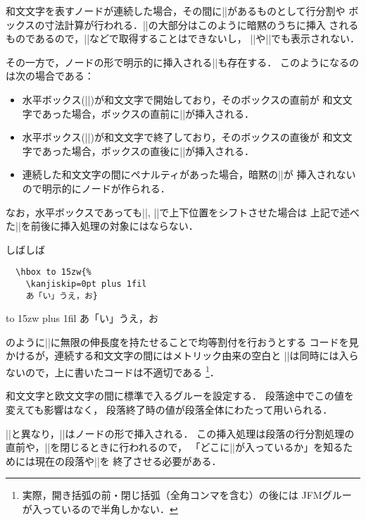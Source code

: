 \documentclass[a4paper,11pt,nomag,dvipdfmx]{jsarticle}
\begin{document}
\begin{dangerous}
 和文文字を表すノードが連続した場合，その間に|\kanjiskip|があるものとして行分割や
 ボックスの寸法計算が行われる．|\kanjiskip|の大部分はこのように暗黙のうちに挿入
 されるものであるので，|\lastskip|などで取得することはできないし，
 |\showlists|や|\showbox|でも表示されない．

  その一方で，ノードの形で明示的に挿入される|\kanjiskip|も存在する．
  このようになるのは次の場合である：
 \begin{itemize}
  \item 水平ボックス(|\hbox|)が和文文字で開始しており，そのボックスの直前が
    和文文字であった場合，ボックスの直前に|\kanjiskip|が挿入される．
  \item 水平ボックス(|\hbox|)が和文文字で終了しており，そのボックスの直後が
    和文文字であった場合，ボックスの直後に|\kanjiskip|が挿入される．
  \item 連続した和文文字の間にペナルティがあった場合，暗黙の|\kanjiskip|が
    挿入されないので明示的にノードが作られる．
 \end{itemize}
 なお，水平ボックスであっても|\raise|, |\lower|で上下位置をシフトさせた場合は
 上記で述べた|\kanjiskip|を前後に挿入処理の対象にはならない．
\end{dangerous}
\begin{dangerous}
  しばしば

  \medskip
  \begin{minipage}{.6\linewidth}
  \begin{verbatim}
  \hbox to 15zw{%
    \kanjiskip=0pt plus 1fil
    あ「い」うえ，お}
  \end{verbatim}
  \end{minipage}\hfill
  \begin{minipage}{.3\linewidth}
  \hbox to 15zw{%
    \kanjiskip=0pt plus 1fil
    あ「い」うえ，お}
  \end{minipage}

  \noindent
  のように|\kanjiskip|に無限の伸長度を持たせることで均等割付を行おうとする
  コードを見かけるが，連続する和文文字の間にはメトリック由来の空白と
  |\kanjiskip|は同時には入らないので，上に書いたコードは不適切である
 \footnote{実際，開き括弧の前・閉じ括弧（全角コンマを含む）の後には
 JFMグルーが入っているので半角しかない．
 }．
\end{dangerous}

\begin{cslist}
\csitem[\.{xkanjiskip}=<skip>]
  和文文字と欧文文字の間に標準で入るグルーを設定する．
  段落途中でこの値を変えても影響はなく，
  段落終了時の値が段落全体にわたって用いられる．
\end{cslist}
\begin{dangerous}
  |\kanjiskip|と異なり，|\xkanjiskip|はノードの形で挿入される．
  この挿入処理は段落の行分割処理の直前や，|\hbox|を閉じるときに行われるので，
  「どこに|\xkanjiskip|が入っているか」を知るためには現在の段落や|\hbox|を
  終了させる必要がある．
\end{dangerous}
\end{document}
